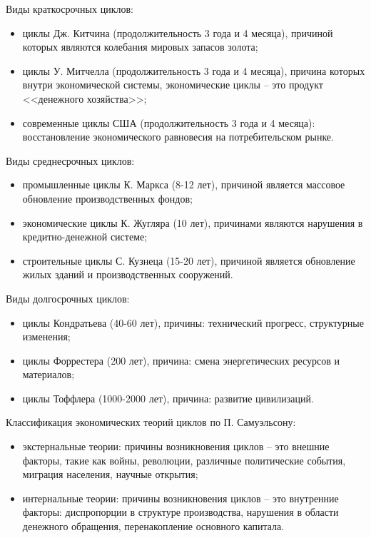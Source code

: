 Виды краткосрочных циклов:
\begin{itemize}
    \item циклы Дж. Китчина (продолжительность 3 года и 4 месяца), причиной
    которых являются колебания мировых запасов золота;
    \item циклы У. Митчелла (продолжительность 3 года и 4 месяца), причина
    которых внутри экономической системы, экономические циклы -- это продукт
    <<денежного хозяйства>>;
    \item современные циклы США (продолжительность 3 года и 4 месяца):
    восстановление экономического равновесия на потребительском рынке.
\end{itemize}

Виды среднесрочных циклов:
\begin{itemize}
    \item промышленные циклы К. Маркса (8-12 лет), причиной является массовое
    обновление производственных фондов;
    \item экономические циклы К. Жугляра (10 лет), причинами являются нарушения
    в кредитно-денежной системе;
    \item строительные циклы С. Кузнеца (15-20 лет), причиной является
    обновление жилых зданий и производственных сооружений.
\end{itemize}

Виды долгосрочных циклов:
\begin{itemize}
    \item циклы Кондратьева (40-60 лет), причины: технический прогресс,
    структурные изменения;
    \item циклы Форрестера (200 лет), причина: смена энергетических ресурсов и
    материалов;
    \item циклы Тоффлера (1000-2000 лет), причина: развитие цивилизаций.
\end{itemize}

Классификация экономических теорий циклов по П. Самуэльсону:
\begin{itemize}
    \item экстернальные теории: причины возникновения циклов -- это внешние
    факторы, такие как войны, революции, различные политические события,
    миграция населения, научные открытия;
    \item интернальные теории: причины возникновения циклов -- это внутренние
    факторы: диспропорции в структуре производства, нарушения в области
    денежного обращения, перенакопление основного капитала.
\end{itemize}

